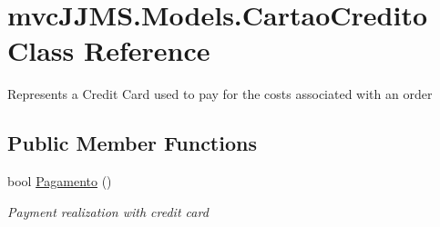 \hypertarget{classmvc_j_j_m_s_1_1_models_1_1_cartao_credito}{}\section{mvc\+J\+J\+M\+S.\+Models.\+Cartao\+Credito Class Reference}
\label{classmvc_j_j_m_s_1_1_models_1_1_cartao_credito}


Represents a Credit Card used to pay for the costs associated with an order  


\subsection*{Public Member Functions}
\begin{DoxyCompactItemize}
\item 
bool \mbox{\hyperlink{classmvc_j_j_m_s_1_1_models_1_1_cartao_credito_ab5535ad2253ef9ed12be8109615de9af}{Pagamento}} ()
\begin{DoxyCompactList}\small\item\em Payment realization with credit card \end{DoxyCompactList}\end{DoxyCompactItemize}
